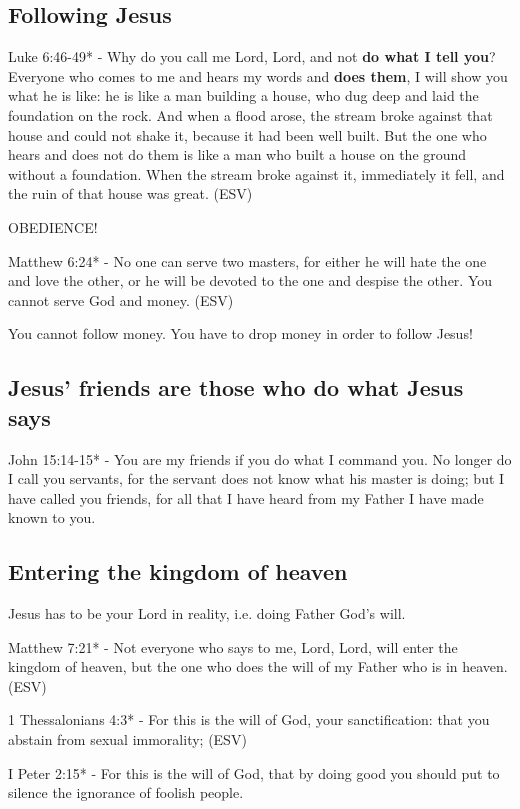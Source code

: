 \documentclass[11pt]{article}
\begin{document}
\subsection{Following Jesus}
\label{sec:org01f249f}
Luke 6:46-49* -  Why do you call me Lord, Lord, and not \textbf{do what I tell you}?  Everyone who comes to me and hears my words and \textbf{does them}, I will show you what he is like: he is like a man building a house, who dug deep and laid the foundation on the rock.  And when a flood arose, the stream broke against that house and could not shake it, because it had been well built.  But the one who hears and does not do them is like a man who built a house on the ground without a foundation.  When the stream broke against it, immediately it fell, and the ruin of that house was great.  (ESV)

OBEDIENCE!

Matthew 6:24* -  No one can serve two masters, for either he will hate the one and love the other, or he will be devoted to the one and despise the other.  You cannot serve God and money.  (ESV)

You cannot follow money. You have to drop money in order to follow Jesus!

\subsection{Jesus' friends are those who do what Jesus says}
\label{sec:org22801f2}
John 15:14-15* - You are my friends if you do what I command you. No longer do I call you servants, for the servant does not know what his master is doing; but I have called you friends, for all that I have heard from my Father I have made known to you.

\subsection{Entering the kingdom of heaven}
\label{sec:org051df64}
Jesus has to be your Lord in reality, i.e. doing Father God's will.

Matthew 7:21* - Not everyone who says to me, Lord, Lord, will enter the kingdom of heaven, but the one who does the will of my Father who is in heaven. (ESV)

1 Thessalonians 4:3* -  For this is the will of God, your sanctification: that you abstain from sexual immorality;  (ESV)

I Peter 2:15* - For this is the will of God, that by doing good you should put to silence the ignorance of foolish people.
\end{document}
